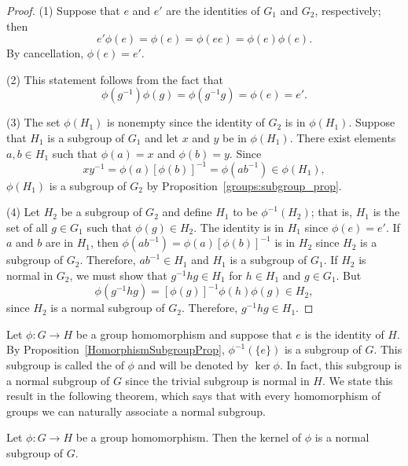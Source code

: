  
\begin{proof}
(1)
Suppose that $e$ and $e'$ are the identities of $G_1$ and $G_2$,
respectively; then
\[
e' \phi(e) = \phi(e) = \phi(e e) = \phi(e) \phi(e).
\]
By cancellation, $\phi(e) = e'$.
 
 
(2)
This statement follows from the fact that
\[
\phi( g^{-1}) \phi(g) = \phi(g^{-1} g) = \phi(e) = e'.
\]
 


(3)
The set $\phi(H_1)$ is nonempty since the identity of $G_2$ is in
$\phi(H_1)$.
Suppose that $H_1$ is a subgroup of $G_1$ and let $x$ and $y$ be in
$\phi(H_1)$. There exist elements $a, b \in H_1$ such that $\phi(a) =
x$ and $\phi(b)=y$. Since 
\[
xy^{-1} = \phi(a)[ \phi(b)]^{-1} = \phi(a b^{-1} ) \in \phi(H_1),
\]
$\phi(H_1)$ is a subgroup of $G_2$ by Proposition~\ref{groups:subgroup_prop}.
 
 
(4)
Let $H_2$ be a subgroup of $G_2$ and define $H_1$ to be
$\phi^{-1}(H_2)$; that is, $H_1$ is the set of all $g \in G_1$ such
that $\phi(g) \in H_2$.  The identity is in $H_1$ since $\phi(e) = e'$.
If $a$ and $b$ are in $H_1$, then $\phi(ab^{-1}) = \phi(a)[ \phi(b)
]^{-1}$ is in $H_2$ since $H_2$ is a subgroup of $G_2$.  Therefore,
$ab^{-1} \in H_1$ and $H_1$ is a subgroup of $G_1$. If $H_2$ is normal
in $G_2$, we must show that $g^{-1} h g \in H_1$ for $h \in H_1$ and
$g \in G_1$. But 
\[
\phi( g^{-1} h g) = [ \phi(g) ]^{-1} \phi( h ) \phi( g ) \in
H_2,
\]
since $H_2$ is a normal subgroup of $G_2$.  Therefore, $g^{-1}hg \in
H_1$.
\end{proof}
 
 
\medskip
 
 
Let $\phi : G \rightarrow H$ be a group homomorphism and suppose that
$e$ is the identity of $H$. By Proposition~\ref{HomorphismSubgroupProp}, $\phi^{-1} ( \{ e \}
)$ is a subgroup of $G$. This subgroup is called the  of $\phi$ and will
be denoted by $\ker \phi$\label{kernelofphi}.  In fact, this subgroup
is a normal subgroup of $G$ since the trivial subgroup is normal in
$H$.  We state this result in the following theorem, which says that
with every homomorphism of groups we can naturally associate a normal
subgroup.   
 
 
\begin{theorem}
Let $\phi : G \rightarrow H$ be a group homomorphism. Then the kernel
of $\phi$ is a normal subgroup of $G$. 
\end{theorem}
 

